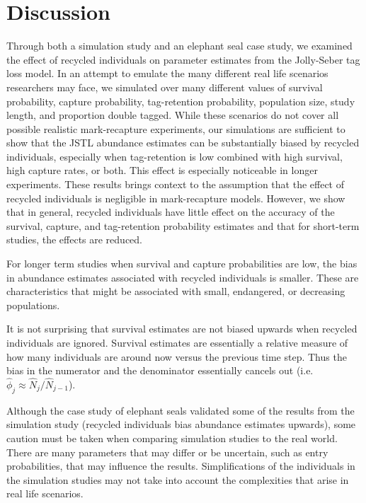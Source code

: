 \documentclass[12pt]{article}
\begin{document}
\section{Discussion}\label{discussion}
Through both a simulation study and an elephant seal case study, we examined the effect of recycled individuals on parameter estimates from the Jolly-Seber tag loss model.
In an attempt to emulate the many different real life scenarios
researchers may face, we simulated over many different values of
survival probability, capture probability, tag-retention probability, population size, study length, and proportion double tagged. While
these scenarios do not cover all possible realistic mark-recapture
experiments, our simulations are sufficient to show that the JSTL
abundance estimates can be substantially biased by recycled individuals,
especially when tag-retention is low combined with high survival, high
capture rates, or both. This effect is especially noticeable in longer
experiments. These results brings context to the assumption that the effect of
recycled individuals is negligible in mark-recapture models. However, we
show that in general, recycled individuals have little effect on the
accuracy of the survival, capture, and tag-retention probability
estimates and that for short-term studies, the effects are reduced.

For longer term studies when survival and capture probabilities are low, the bias in abundance estimates associated with recycled individuals is smaller.  These are characteristics that might be associated with small, endangered, or decreasing populations. 

It is not surprising that survival estimates are not biased upwards when recycled individuals are ignored.  Survival estimates are essentially a relative measure of how many individuals are around now versus the previous time step.  Thus the bias in the numerator and the denominator essentially cancels out (i.e. $\hat{\phi}_j \approx \hat{N}_{j}/\hat{N}_{j-1}$).	

Although the case study of elephant seals validated some of the results from
the simulation study (recycled individuals bias abundance estimates
upwards), some caution must be taken when comparing simulation studies
to the real world. There are many parameters that may differ or be
uncertain, such as entry probabilities, that may influence the results.
Simplifications of the individuals in the simulation studies may not
take into account the complexities that arise in real life
scenarios.
\end{document}
